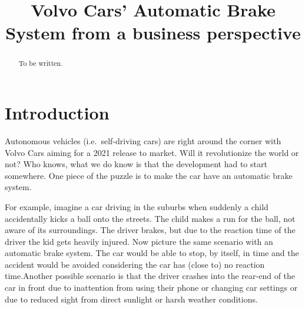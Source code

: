 \documentclass[conference]{IEEEtran}
\begin{document}
\title{Volvo Cars' Automatic Brake System from a business perspective}

\author{
\and
{}
}

\maketitle

\begin{abstract}
To be written.
\end{abstract}


\section{Introduction}
Autonomous vehicles (i.e.\ self-driving cars) are right around the corner with Volvo Cars aiming for a 2021 release to market. \cite{ADToMarket} Will it revolutionize the world or not? Who knows, what we do know is that the development had to start somewhere. One piece of the puzzle is to make the car have an automatic brake system. 

For example, imagine a car driving in the suburbs when suddenly a child accidentally kicks a ball onto the streets. The child makes a run for the ball, not aware of its surroundings. The driver brakes, but due to the reaction time of the driver the kid gets heavily injured. Now picture the same scenario with an automatic brake system. The car would be able to stop, by itself, in time and the accident would be avoided considering the car has (close to) no reaction time.Another possible scenario is that the driver crashes into the rear-end of the car in front due to inattention from using their phone or changing car settings or due to reduced sight from direct sunlight or harsh weather conditions.
\end{document}
